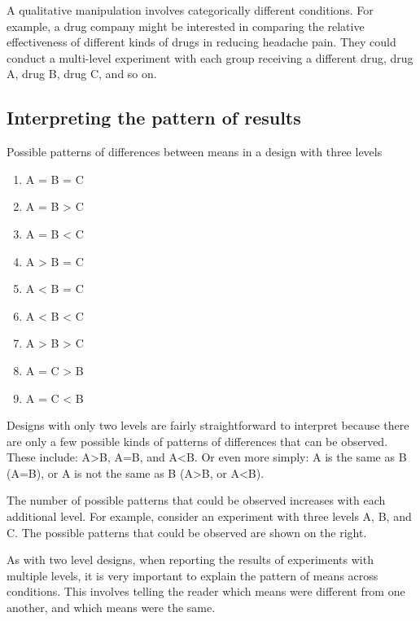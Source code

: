 A qualitative manipulation involves categorically different conditions.
For example, a drug company might be interested in comparing the
relative effectiveness of different kinds of drugs in reducing headache
pain. They could conduct a multi-level experiment with each group
receiving a different drug, drug A, drug B, drug C, and so on.

\subsection{Interpreting the pattern of results}\label{interpreting-the-pattern-of-results}

\begin{marginfigure}
Possible patterns of differences between means in a design with three
levels

\begin{enumerate}
\def\labelenumi{\arabic{enumi}.}
\item
  A = B = C
\item
  A = B \textgreater{} C
\item
  A = B \textless{} C
\item
  A \textgreater{} B = C
\item
  A \textless{} B = C
\item
  A \textless{} B \textless{} C
\item
  A \textgreater{} B \textgreater{} C
\item
  A = C \textgreater{} B
\item
  A = C \textless{} B
\end{enumerate}
\end{marginfigure}

Designs with only two levels are fairly straightforward to interpret
because there are only a few possible kinds of patterns of differences
that can be observed. These include: A\textgreater{}B, A=B, and
A\textless{}B. Or even more simply: A is the same as B (A=B), or A is
not the same as B (A\textgreater{}B, or A\textless{}B).

The number of possible patterns that could be observed increases with
each additional level. For example, consider an experiment with three
levels A, B, and C. The possible patterns that could be observed are
shown on the right.

As with two level designs, when reporting the results of experiments
with multiple levels, it is very important to explain the pattern of
means across conditions. This involves telling the reader which means
were different from one another, and which means were the same.

